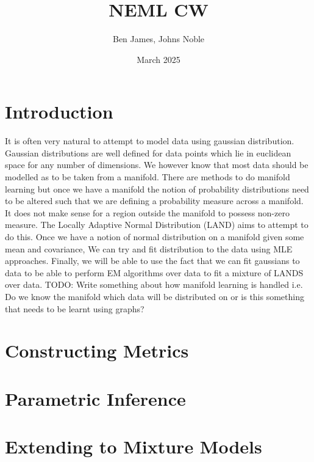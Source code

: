 \documentclass{article}
\title{NEML CW}
\author{Ben James, Johns Noble}
\date{March 2025}
\begin{document}
\maketitle
\tableofcontents
\section{Introduction}
It is often very natural to attempt to model data using gaussian distribution. 
Gaussian distributions are well defined for data points which lie in euclidean space for any number of dimensions.
We however know that most data should be modelled as to be taken from a manifold.
There are methods to do manifold learning but once we have a manifold the notion of probability distributions need to be altered such that we are defining a probability measure across a manifold.
It does not make sense for a region outside the manifold to possess non-zero measure.
The Locally Adaptive Normal Distribution (LAND) aims to attempt to do this.
Once we have a notion of normal distribution on a manifold given some mean and covariance, We can try and fit distribution to the data using MLE approaches.
Finally, we will be able to use the fact that we can fit gaussians to data to be able to perform EM algorithms over data to fit a mixture of LANDS over data.
TODO: Write something about how manifold learning is handled i.e. Do we know the manifold which data will be distributed on or is this something that needs to be learnt using graphs?
\section{Constructing Metrics}
\section{Parametric Inference}
\section{Extending to Mixture Models}
\end{document}
